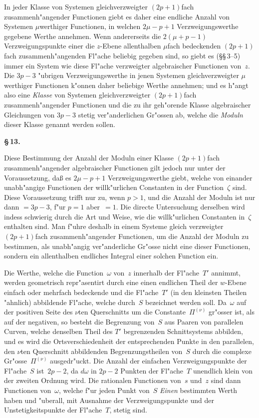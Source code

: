 \documentclass[12pt,a4paper]{article}
\begin{document}
In jeder Klasse von Systemen gleichverzweigter $(2p+1)$fach
zusammenh"angender Functionen giebt es daher eine endliche Anzahl von
Systemen $\mu$werthiger Functionen, in welchen $2\mu - p + 1$
Verzweigungswerthe gegebene Werthe annehmen. Wenn andererseits die
$2(\mu + p - 1)$ Verzweigungspunkte einer die $z$-Ebene allenthalben
$\mu$fach bedeckenden $(2p+1)$fach zusammenh"angenden Fl"ache beliebig
gegeben sind, so giebt es (\S\S\,3--5) immer ein System wie diese Fl"ache
verzweigter algebraischer Functionen von~$z$. Die $3p - 3$ "ubrigen
Verzweigungswerthe in jenen Systemen gleichverzweigter $\mu$werthiger
Functionen k"onnen daher beliebige Werthe annehmen; und es h"angt also
eine \emph{Klasse} von Systemen gleichverzweigter $(2p+1)$fach zusammenh"angender
Functionen und die zu ihr geh"orende Klasse algebraischer Gleichungen
von $3p - 3$ stetig ver"anderlichen Gr"ossen ab, welche die \emph{Moduln}
dieser Klasse genannt werden sollen.

\medskip
\textbf{\S\,13.}

Diese Bestimmung der Anzahl der Moduln einer Klasse $(2p+1)$fach
zusammenh"angender algebraischer Functionen gilt jedoch nur unter der
Voraussetzung, da\ss{} es $2\mu - p + 1$ Verzweigungswerthe giebt, welche von
einander unabh"angige Functionen der willk"urlichen Constanten in der
Function~$\zeta$ sind. Diese Voraussetzung trifft nur zu, wenn $p > 1$, und
die Anzahl der Moduln ist nur dann $= 3p - 3$, f"ur $p = 1$ aber~$= 1$.
Die directe Untersuchung derselben wird indess schwierig durch die Art und
Weise, wie die willk"urlichen Constanten in~$\zeta$ enthalten sind. Man f"uhre
deshalb in einem Systeme gleich verzweigter $(2p+1)$fach zusammenh"angender
Functionen, um die Anzahl der Moduln zu bestimmen, als unabh"angig
ver"anderliche Gr"osse nicht eine dieser Functionen, sondern ein allenthalben
endliches Integral einer solchen Function ein.

Die Werthe, welche die Function~$\omega$ von~$z$ innerhalb der Fl"ache~$T'$
annimmt, werden geometrisch repr"asentirt durch eine einen endlichen Theil
der $w$-Ebene einfach oder mehrfach bedeckende und die Fl"ache~$T'$ (in
den kleinsten Theilen "ahnlich) abbildende Fl"ache, welche durch~$S$
bezeichnet werden soll. Da~$\omega$ auf der positiven Seite des $\nu$ten
Querschnitts um die Constante~$\Pi^{(\nu)}$ gr"osser ist, als auf der negativen,
so besteht die Begrenzung von~$S$ aus Paaren von parallelen Curven,
welche denselben Theil des $T'$ begrenzenden Schnittsystems abbilden, und
es wird die Ortsverschiedenheit der entsprechenden Punkte in den parallelen,
den $\nu$ten Querschnitt abbildenden Begrenzungstheilen von~$S$ durch die
complexe Gr"osse~$\Pi^{(\nu)}$ ausgedr"uckt. Die Anzahl der einfachen
Verzweigungspunkte der Fl"ache~$S$ ist~$2p - 2$, da $d\omega$ in $2p - 2$
Punkten der Fl"ache~$T$ unendlich klein von der zweiten Ordnung wird.
Die rationalen Functionen von~$s$ und~$z$ sind dann Functionen von~$\omega$,
welche f"ur jeden Punkt von~$S$ \emph{Einen} bestimmten Werth haben und
"uberall, mit Ausnahme der Verzweigungspunkte und der Unstetigkeitspunkte
der Fl"ache~$T$, stetig sind.
\end{document}
